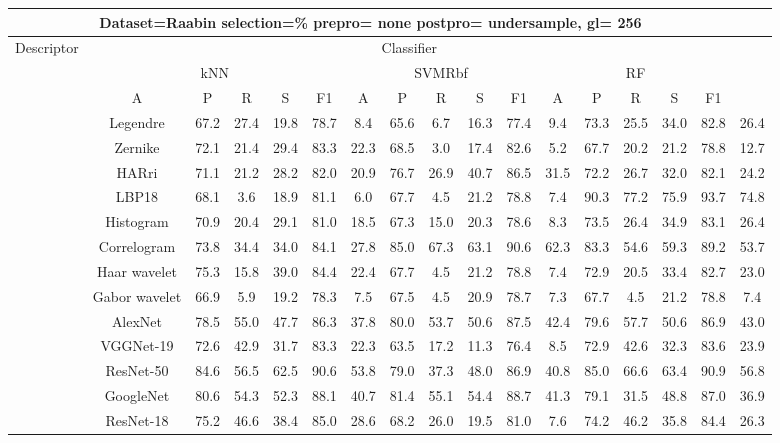 \documentclass[12pt,italian]{article}
\begin{document}
\begin{tiny}
\begin{longtable}{lcccccccccccccccc}
\toprule
\multicolumn{16}{c}{Dataset=Raabin selection=\% prepro= none postpro= undersample, gl= 256} \\ 
\toprule
Descriptor & \multicolumn{15}{c}{Classifier} \\ 
& \multicolumn{5}{c}{kNN} & \multicolumn{5}{c}{SVMRbf} & \multicolumn{5}{c}{RF} \\ 
& A & P & R & S & F1 & A & P & R & S & F1 & A & P & R & S & F1 \\ 
\midrule
& Legendre & 67.2 & 27.4 & 19.8 & 78.7 &  8.4 & 65.6 &  6.7 & 16.3 & 77.4 &  9.4 & 73.3 & 25.5 & 34.0 & 82.8 & 26.4 \\ 
& Zernike & 72.1 & 21.4 & 29.4 & 83.3 & 22.3 & 68.5 &  3.0 & 17.4 & 82.6 &  5.2 & 67.7 & 20.2 & 21.2 & 78.8 & 12.7 \\ 
& HARri & 71.1 & 21.2 & 28.2 & 82.0 & 20.9 & 76.7 & 26.9 & 40.7 & 86.5 & 31.5 & 72.2 & 26.7 & 32.0 & 82.1 & 24.2 \\ 
& LBP18 & 68.1 &  3.6 & 18.9 & 81.1 &  6.0 & 67.7 &  4.5 & 21.2 & 78.8 &  7.4 & 90.3 & 77.2 & 75.9 & 93.7 & 74.8 \\ 
& Histogram & 70.9 & 20.4 & 29.1 & 81.0 & 18.5 & 67.3 & 15.0 & 20.3 & 78.6 &  8.3 & 73.5 & 26.4 & 34.9 & 83.1 & 26.4 \\ 
& Correlogram & 73.8 & 34.4 & 34.0 & 84.1 & 27.8 & 85.0 & 67.3 & 63.1 & 90.6 & 62.3 & 83.3 & 54.6 & 59.3 & 89.2 & 53.7 \\ 
& Haar wavelet & 75.3 & 15.8 & 39.0 & 84.4 & 22.4 & 67.7 &  4.5 & 21.2 & 78.8 &  7.4 & 72.9 & 20.5 & 33.4 & 82.7 & 23.0 \\ 
& Gabor wavelet & 66.9 &  5.9 & 19.2 & 78.3 &  7.5 & 67.5 &  4.5 & 20.9 & 78.7 &  7.3 & 67.7 &  4.5 & 21.2 & 78.8 &  7.4 \\ 
& AlexNet & 78.5 & 55.0 & 47.7 & 86.3 & 37.8 & 80.0 & 53.7 & 50.6 & 87.5 & 42.4 & 79.6 & 57.7 & 50.6 & 86.9 & 43.0 \\ 
& VGGNet-19 & 72.6 & 42.9 & 31.7 & 83.3 & 22.3 & 63.5 & 17.2 & 11.3 & 76.4 &  8.5 & 72.9 & 42.6 & 32.3 & 83.6 & 23.9 \\ 
& ResNet-50 & 84.6 & 56.5 & 62.5 & 90.6 & 53.8 & 79.0 & 37.3 & 48.0 & 86.9 & 40.8 & 85.0 & 66.6 & 63.4 & 90.9 & 56.8 \\ 
& GoogleNet & 80.6 & 54.3 & 52.3 & 88.1 & 40.7 & 81.4 & 55.1 & 54.4 & 88.7 & 41.3 & 79.1 & 31.5 & 48.8 & 87.0 & 36.9 \\ 
& ResNet-18 & 75.2 & 46.6 & 38.4 & 85.0 & 28.6 & 68.2 & 26.0 & 19.5 & 81.0 &  7.6 & 74.2 & 46.2 & 35.8 & 84.4 & 26.3 \\ 

\end{longtable}
\end{tiny}
\end{document}
